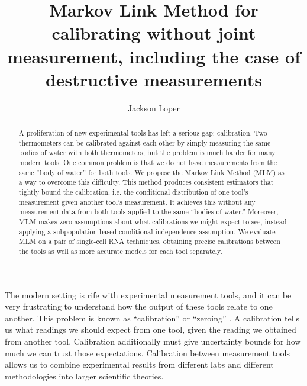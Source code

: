 



\DeclareMathOperator*{\tr}{tr}

\newcommand{\UN}[1]{\ensuremath{\left|#1\right|_\infty}}
\newcommand{\EN}[1]{\ensuremath{\left|#1\right|}}
\newcommand{\kldiv}[2]{\ensuremath{D\left(#1||#2\right)}}

\usepackage{cancel}


\title{Markov Link Method for calibrating without joint measurement, including the case of destructive measurements}
\author{Jackson Loper}

\usepackage{amsthm}
\newtheorem*{thm}{Theorem}
\newtheorem{lem}{Lemma}
\newtheorem{conj}{Conjecture}

\theoremstyle{definition}
\newtheorem{example}{Example}


\maketitle

\begin{abstract}
A proliferation of new experimental tools has left a serious gap: calibration. Two thermometers can be calibrated against each other by simply measuring the same bodies of water with both thermometers, but the problem is much harder for many modern tools.  One common problem is that we do not have measurements from the same ``body of water'' for both tools.  We propose the Markov Link Method (MLM) as a way to overcome this difficulty.   This method produces consistent estimators that tightly bound the calibration, i.e. the conditional distribution of one tool's measurement given another tool's measurement. It achieves this without any measurement data from both tools applied to the same ``bodies of water.'' Moreover, MLM makes zero assumptions about what calibrations we might expect to see, instead applying a subpopulation-based conditional independence assumption.   We evaluate MLM on a pair of single-cell RNA techniques, obtaining precise calibrations between the tools as well as more accurate models for each tool separately.
\end{abstract}

The modern setting is rife with experimental measurement tools, and it can be very frustrating to understand how the output of these tools relate to one another.  This problem is known as ``calibration'' or ``zeroing'' \cite{bipm2008international}.  A calibration tells us what readings we should expect from one tool, given the reading we obtained from another tool.   Calibration additionally must give uncertainty bounds for how much we can trust those expectations.  Calibration between measurement tools allows us to combine experimental results from different labs and different methodologies into larger scientific theories.  

